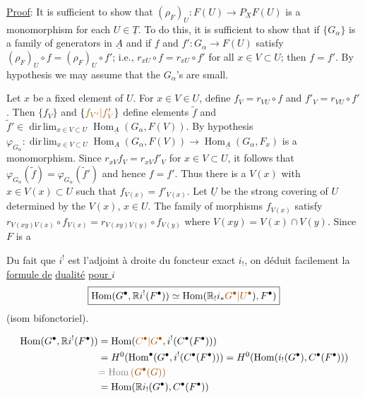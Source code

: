 \uline{Proof}: It is sufficient to show that $(\rho_F)_U:F(U)\longrightarrow P_XF(U)$ is
a monomorphism for each $U\in\underline{T}$. To do this, it is sufficient to
show that if $\{G_\alpha\}$ is a family of generators in $\underline{A}$ and if $f$
and $f':G_\alpha\longrightarrow F(U)$ satisfy $(\rho_F)_U\circ f=(\rho_F)_U\circ f'$; i.e.,
$r_{xU}\circ f=r_{xU}\circ f'$ for all $x\in V\subset U$; then $f=f'$. By
hypothesis we may assume that the $G_\alpha$'s are small.

Let $x$ be a fixed element of $U$. For $x\in V\in U$, define
$f_V=r_{VU}\circ f$ and $f'_V=r_{VU}\circ f'$. Then $\{f_V\}$ and $\{\unsure{f_{V'}|f'_V}\}$
define elements $\tilde{f}$ and $\tilde{f}'\in\operatorname*{dir\,lim}_{x\in V\subset U}\operatorname{Hom}_{\underline{A}}(G_\alpha,F(V))$. By
hypothesis $\varphi_{G_\alpha}:\operatorname*{dir\,lim}_{x\in V\subset U}\operatorname{Hom}_{\underline{A}}(G_\alpha,F(V))\longrightarrow\operatorname{Hom}_{\underline{A}}(G_\alpha,F_x)$ is
a monomorphism. Since $r_{xV}f_V=r_{xV}f'_V$ for $x\in V\subset U$, it
follows that $\varphi_{G_\alpha}(\tilde{f})=\varphi_{G_\alpha}(\tilde{f}')$ and hence $f=f'$. Thus there
is a $V(x)$ with $x\in V(x)\subset U$ such that $f_{V(x)}=f'_{V(x)}$. Let
$\underline{U}$ be the strong covering of $U$ determined by the $V(x)$, $x\in U$.
The family of morphisms $f_{V(x)}$ satisfy $r_{V(xy)V(x)}\circ f_{V(x)}=
r_{V(xy)V(y)}\circ f_{V(y)}$ where $V(xy)=V(x)\cap V(y)$. Since $F$ is a


Du fait que $i^!$ est l'adjoint à droite
du foncteur exact  $i_!$, on
déduit facilement la \uline{formule de}
\uline{dualité} \uline{pour $i$}
\[
\boxed{\operatorname{Hom}(G^\bullet,\mathbb{R}i^!(F^\bullet))
\simeq\operatorname{Hom}(\mathbb{R}_!i_*\unsure{G^\bullet|U^\bullet}),F^\bullet)}
\]
(isom bifonctoriel).

\[
\begin{aligned}
\operatorname{Hom}(G^\bullet,\mathbb{R}i^!(F^\bullet))
&=\operatorname{Hom}(\unsure{C^\bullet|G^\bullet},i^!(C^\bullet(F^\bullet)))\\
&=H^0(\operatorname{Hom}^{\bullet}(G^\bullet,i^!(C^\bullet(F^\bullet)))
=H^0(\operatorname{Hom}(i_!(G^\bullet),C^\bullet(F^\bullet)))\\
&\deleted{=\operatorname{Hom}\unsure{(G^\bullet(G))}}\\
&=\operatorname{Hom}(\mathbb{R}i_!(G^\bullet),C^\bullet(F^\bullet))
\end{aligned}
\]

